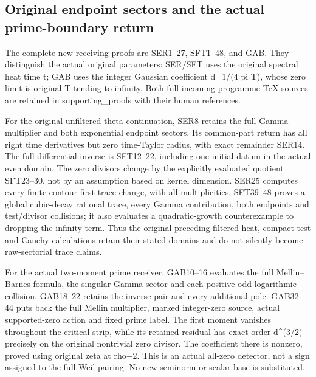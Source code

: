 \documentclass[
  10pt,
  a4paper,
]{article}
\begin{document}
\subsection{Original endpoint sectors and the actual prime-boundary
return}\label{original-endpoint-sectors-and-the-actual-prime-boundary-return}

The complete new receiving proofs are
\href{SECTORIAL_ENDPOINT_ZERO_TRACE_RETURN.md}{SER1--27},
\href{SECTORIAL_FILTER_TRACE_DERIVATION.md}{SFT1--48}, and
\href{GAUSSIAN_ARITHMETIC_BOUNDARY_RETURN.md}{GAB}. They distinguish the
actual original parameters: SER/SFT uses the original spectral heat time
t; GAB uses the integer Gaussian coefficient d=1/(4 pi T), whose zero
limit is original T tending to infinity. Both full incoming programme
TeX sources are retained in supporting\_proofs with their human
references.

For the original unfiltered theta continuation, SER8 retains the full
Gamma multiplier and both exponential endpoint sectors. Its common-part
return has all right time derivatives but zero time-Taylor radius, with
exact remainder SER14. The full differential inverse is SFT12--22,
including one initial datum in the actual even domain. The zero divisors
change by the explicitly evaluated quotient SFT23--30, not by an
assumption based on kernel dimension. SER25 computes every
finite-contour first trace change, with all multiplicities. SFT39--48
proves a global cubic-decay rational trace, every Gamma contribution,
both endpoints and test/divisor collisions; it also evaluates a
quadratic-growth counterexample to dropping the infinity term. Thus the
original preceding filtered heat, compact-test and Cauchy calculations
retain their stated domains and do not silently become raw-sectorial
trace claims.

For the actual two-moment prime receiver, GAB10--16 evaluates the full
Mellin--Barnes formula, the singular Gamma sector and each positive-odd
logarithmic collision. GAB18--22 retains the inverse pair and every
additional pole. GAB32--44 puts back the full Mellin multiplier, marked
integer-zero source, actual supported-zero action and fixed prime label.
The first moment vanishes throughout the critical strip, while its
retained residual has exact order d\^{}(3/2) precisely on the original
nontrivial zero divisor. The coefficient there is nonzero, proved using
original zeta at rho−2. This is an actual all-zero detector, not a sign
assigned to the full Weil pairing. No new seminorm or scalar base is
substituted.
\end{document}
